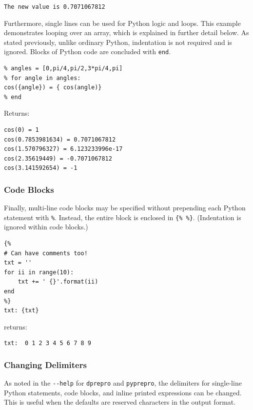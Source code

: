 {\begin{verbatim}
The new value is 0.7071067812
\end{verbatim}

Furthermore, single lines can be used for Python logic and loops. This example 
demonstrates looping over an array, which is explained in further detail below.
As stated previously, unlike ordinary Python, indentation is not required and is 
ignored. Blocks of Python code are concluded with \texttt{end}.

\begin{verbatim}
% angles = [0,pi/4,pi/2,3*pi/4,pi]
% for angle in angles:
cos({angle}) = { cos(angle)}
% end
\end{verbatim}

Returns:

\begin{verbatim}
cos(0) = 1
cos(0.7853981634) = 0.7071067812
cos(1.570796327) = 6.123233996e-17
cos(2.35619449) = -0.7071067812
cos(3.141592654) = -1
\end{verbatim}

\subsubsection{Code Blocks}\label{interfaces:code-blocks}

Finally, multi-line code blocks may be specified without prepending each 
Python statement with \texttt{\%}. Instead, the entire block is enclosed
in \texttt{\{\% \%\}}. (Indentation is ignored within code blocks.)

\begin{verbatim}
{%
# Can have comments too!
txt = ''
for ii in range(10):
    txt += ' {}'.format(ii)
end
%}
txt: {txt}
\end{verbatim}

returns:

\begin{verbatim}
txt:  0 1 2 3 4 5 6 7 8 9
\end{verbatim}

\subsubsection{Changing Delimiters}\label{interfaces:changing-delimiters}

As noted in the \texttt{-\/-help} for \texttt{dprepro} and \texttt{pyprepro},
the delimiters for single-line Python statements, code blocks, and inline 
printed expressions can be changed. This is useful when the defaults are 
reserved characters in the output format.

}
